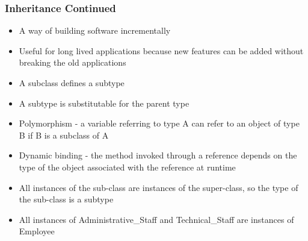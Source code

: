 \documentclass[t,12pt,numbers,fleqn]{beamer}
\begin{document}

\begin{frame}
\frametitle{Inheritance Continued}

\begin{itemize}
\item A way of building software incrementally
\item Useful for long lived applications because new features can be added without breaking the old applications
\item A subclass defines a subtype
\item A subtype is substitutable for the parent type
\item Polymorphism - a variable referring to type A can refer to an object of type B if B is a subclass of A
\item Dynamic binding - the method invoked through a reference depends on the type of the object associated with the
reference at runtime
\item All instances of the sub-class are instances of the super-class, so the type of the sub-class is a subtype
\item All instances of Administrative\_Staff and Technical\_Staff are instances of Employee
\end{itemize}
\end{frame}





\end{document}
